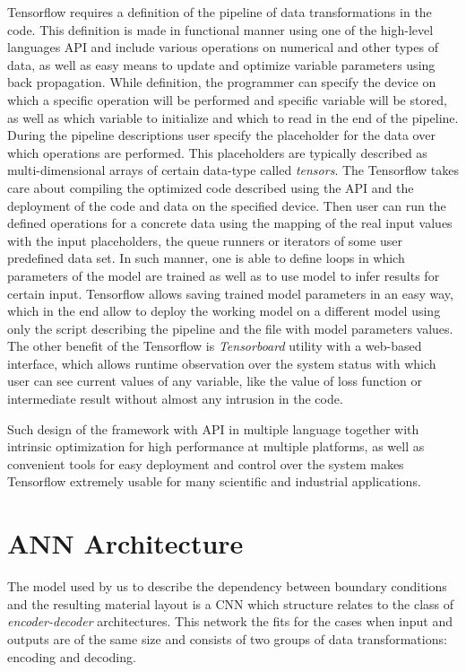 Tensorflow requires a definition of the pipeline of data transformations in the code.
This definition is made in functional manner using one of the high-level languages API and include various operations on numerical and other types of data, as well as easy means to update and optimize variable parameters using back propagation. 
While definition, the programmer can specify the device on which a specific operation will be performed and specific variable will be stored, as well as which variable to initialize and which to read in the end of the pipeline. 
During the pipeline descriptions user specify the placeholder for the data over which operations are performed. 
This placeholders are typically described as multi-dimensional arrays of certain data-type called \textit{tensors}.
The Tensorflow takes care about compiling the optimized code described using the API and the deployment of the code and data on the specified device. 
Then user can run the defined operations for a concrete data using the mapping of the real input values with the input placeholders, the queue runners or iterators of some user predefined data set.
In such manner, one is able to define loops in which parameters of the model are trained as well as to use model to infer results for certain input.
Tensorflow allows saving trained model parameters in an easy way, which in the end allow to deploy the working model on a different model using only the script describing the pipeline and the file with model parameters values.
The other benefit of the Tensorflow is \textit{Tensorboard} utility with a web-based interface, which allows runtime observation over the system status with which user can see current values of any variable, like the value of loss function or intermediate result without almost any intrusion in the code.
\medskip

Such design of the framework with API in multiple language together with intrinsic optimization for high performance at multiple platforms, as well as convenient tools for easy deployment and control over the system makes Tensorflow extremely usable for many scientific and industrial applications.


\section{ANN Architecture}

The model used by us to describe the dependency between boundary conditions and the resulting material layout is a CNN which structure relates to the class of \textit{encoder-decoder} architectures.
This network the fits for the cases when input and outputs are of the same size and consists of two groups of data transformations: encoding and decoding.
\medskip

